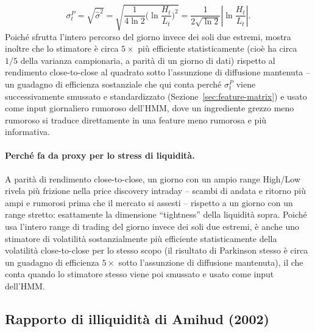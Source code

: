 \documentclass[11pt]{article}
\theoremstyle{definition}
\theoremstyle{remark}
\begin{document}
\[
\sigma^P_t = \sqrt{\widehat\sigma^2} = \sqrt{\frac{1}{4\ln2}\Big(\ln\frac{H_t}{L_t}\Big)^2} = \frac{1}{2\sqrt{\ln2}}\left|\ln\frac{H_t}{L_t}\right|.
\]
Poich\'e sfrutta l'intero percorso del giorno invece dei soli due estremi, \cite{parkinson1980} mostra inoltre che lo stimatore \`e circa $5\times$ pi\`u efficiente statisticamente (cio\`e ha circa $1/5$ della varianza campionaria, a parit\`a di un giorno di dati) rispetto al rendimento close-to-close al quadrato sotto l'assunzione di diffusione mantenuta -- un guadagno di efficienza sostanziale che qui conta perch\'e $\sigma^P_t$ viene successivamente smussato e standardizzato (Sezione~\ref{sec:feature-matrix}) e usato come input giornaliero rumoroso dell'HMM, dove un ingrediente grezzo meno rumoroso si traduce direttamente in una feature meno rumorosa e pi\`u informativa.

\paragraph{Perch\'e fa da proxy per lo stress di liquidit\`a.} A parit\`a di rendimento close-to-close, un giorno con un ampio range High/Low rivela pi\`u frizione nella price discovery intraday -- scambi di andata e ritorno pi\`u ampi e rumorosi prima che il mercato si assesti -- rispetto a un giorno con un range stretto: esattamente la dimensione ``tightness'' della liquidit\`a sopra. Poich\'e usa l'intero range di trading del giorno invece dei soli due estremi, \`e anche uno stimatore di volatilit\`a sostanzialmente pi\`u efficiente statisticamente della volatilit\`a close-to-close per lo stesso scopo (il risultato di Parkinson stesso \`e circa un guadagno di efficienza $5\times$ sotto l'assunzione di diffusione mantenuta), il che conta quando lo stimatore stesso viene poi smussato e usato come input dell'HMM.

\subsection{Rapporto di illiquidit\`a di Amihud (2002)}
\label{sec:amihud}
\end{document}
